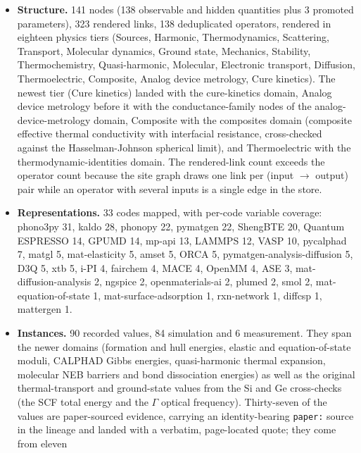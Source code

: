 \documentclass[11pt,a4paper]{article}
\begin{document}
\begin{itemize}[leftmargin=2em, itemsep=0.25em]
  \item \textbf{Structure.} 141 nodes (138 observable and hidden quantities plus 3
        promoted parameters), 323 rendered links, 138 deduplicated operators,
        rendered in eighteen physics tiers (Sources, Harmonic, Thermodynamics,
        Scattering, Transport, Molecular dynamics, Ground state, Mechanics,
        Stability, Thermochemistry, Quasi-harmonic, Molecular, Electronic
        transport, Diffusion, Thermoelectric, Composite, Analog device
        metrology, Cure kinetics). The newest tier (Cure kinetics) landed with
        the cure-kinetics domain, Analog device metrology before it with the
        conductance-family nodes of the analog-device-metrology domain,
        Composite with the composites domain (composite
        effective thermal conductivity with interfacial resistance, cross-checked
        against the Hasselman-Johnson spherical limit), and Thermoelectric
        with the thermodynamic-identities domain. The
        rendered-link count exceeds the operator count because the site graph
        draws one link per (input $\to$ output) pair while an operator with
        several inputs is a single edge in the store.
  \item \textbf{Representations.} 33 codes mapped, with per-code variable coverage:
        phono3py 31, kaldo 28, phonopy 22, pymatgen 22, ShengBTE 20,
        Quantum ESPRESSO 14, GPUMD 14, mp-api 13, LAMMPS 12, VASP 10, pycalphad 7,
        matgl 5, mat-elasticity 5, amset 5, ORCA 5, pymatgen-analysis-diffusion 5,
        D3Q 5, xtb 5, i-PI 4, fairchem 4, MACE 4, OpenMM 4,
        ASE 3, mat-diffusion-analysis 2, ngspice 2, openmaterials-ai 2, plumed 2, smol 2,
        mat-equation-of-state 1, mat-surface-adsorption 1, rxn-network 1, diffcsp 1,
        mattergen 1.
  \item \textbf{Instances.} 90 recorded values, 84 simulation and 6 measurement.
        They span the newer domains (formation and hull energies, elastic and
        equation-of-state moduli, CALPHAD Gibbs energies, quasi-harmonic thermal
        expansion, molecular NEB barriers and bond dissociation energies) as
        well as the original thermal-transport and ground-state values from the
        Si and Ge cross-checks (the SCF total energy and the $\Gamma$ optical
        frequency). Thirty-seven of the values are paper-sourced evidence,
        carrying an identity-bearing \texttt{paper:} source in the lineage and
        landed with a verbatim, page-located quote; they come from eleven

\end{itemize}
\end{document}

